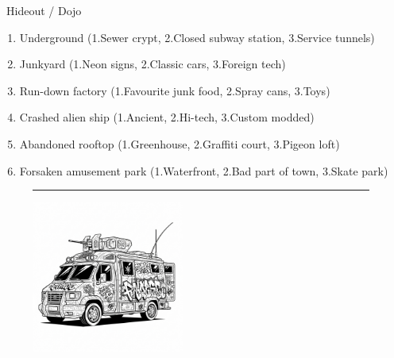 \Large{}~Hideout / Dojo
\normalfont\large
\vspace{-6pt}
\begin{enumerate}
    \setlength\itemsep{-0.5em}
    \item Underground (1.Sewer crypt, 2.Closed subway station, 3.Service tunnels)
    \item Junkyard (1.Neon signs, 2.Classic cars, 3.Foreign tech)
    \item Run-down factory (1.Favourite junk food, 2.Spray cans, 3.Toys)
    \item Crashed alien ship (1.Ancient, 2.Hi-tech, 3.Custom modded)
    \item Abandoned rooftop (1.Greenhouse, 2.Graffiti court, 3.Pigeon loft)
    \item Forsaken amusement park (1.Waterfront, 2.Bad part of town, 3.Skate park)
\end{enumerate}


\begin{figure}[h!]
\rule{\linewidth}{2pt}
\centering\includegraphics[height=5cm]{images/van.png}
\end{figure}
